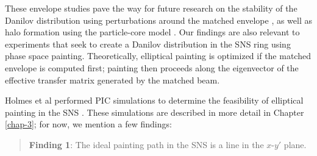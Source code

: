 These envelope studies pave the way for future research on the stability of the Danilov distribution using perturbations around the matched envelope \cite{Goswami2016}, as well as halo formation using the particle-core model \cite{Wangler1998, Gluckstern1994, Gluckstern1998}. Our findings are also relevant to experiments that seek to create a Danilov distribution in the SNS ring using phase space painting. Theoretically, elliptical painting is optimized if the matched envelope is computed first; painting then proceeds along the eigenvector of the effective transfer matrix generated by the matched beam. 

Holmes et al performed PIC simulations to determine the feasibility of elliptical painting in the SNS \cite{Holmes2018}. These simulations are described in more detail in Chapter \ref{chap-3}; for now, we mention a few findings:

\begin{quote}
    \textbf{Finding 1}: The ideal painting path in the SNS is a line in the $x$-$y'$ plane.
\end{quote}


